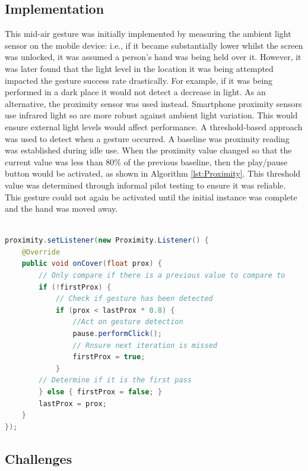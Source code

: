 \documentclass{l4proj}
\begin{document}
\subsection{Implementation}
This mid-air gesture was initially implemented by measuring the ambient light sensor on the mobile device: i.e., if it became substantially lower whilst the screen was unlocked, it was assumed a person's hand was being held over it. However, it was later found that the light level in the location it was being attempted impacted the gesture success rate drastically. For example, if it was being performed in a dark place it would not detect a decrease in light. As an alternative, the proximity sensor was used instead. Smartphone proximity sensors use infrared light so are more robust against ambient light variation. This would ensure external light levels would affect performance. A threshold-based approach was used to detect when a gesture occurred. A baseline was proximity reading was established during idle use. When the proximity value changed so that the current value was less than 80\% of the previous baseline, then the play/pause button would be activated, as shown in Algorithm \ref{lst:Proximity}. This threshold value was determined through informal pilot testing to ensure it was reliable. This gesture could not again be activated until the initial instance was complete and the hand was moved away.

\begin{lstlisting}[language=java, float, caption={Java code detailing how the Pause/Play Gesture is detected and how it is acted upon.}, label=lst:Proximity]

proximity.setListener(new Proximity.Listener() {
    @Override
    public void onCover(float prox) {
        // Only compare if there is a previous value to compare to
        if (!firstProx) {
            // Check if gesture has been detected
            if (prox < lastProx * 0.8) {
                //Act on gesture detection
                pause.performClick();
                // Rnsure next iteration is missed
                firstProx = true;
            }
        // Determine if it is the first pass
        } else { firstProx = false; }
        lastProx = prox;
    }
});
\end{lstlisting}

\subsection{Challenges}

\end{document}
